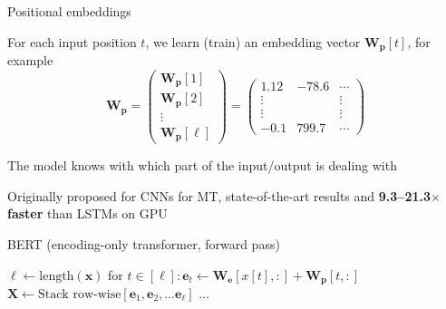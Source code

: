 \documentclass[12pt,aspectratio=169,handout]{beamer}
\begin{document}
\begin{frame}{Positional embeddings}

For each input position $t$, we learn (train) an embedding vector $\bm{W_p}[t]$, for example
$$
\bm{W_p} =
\begin{pmatrix}
\bm{W_p}[1] \\
\bm{W_p}[2] \\
\vdots \\
\bm{W_p}[\ell]
\end{pmatrix}
=
\begin{pmatrix}
1.12 & -78.6 & \cdots \\
\vdots & & \vdots \\
\vdots & & \vdots \\
-0.1 & 799.7 & \cdots
\end{pmatrix}
$$

The model knows with which part of the input/output is dealing with

\begin{small}
Originally proposed for CNNs for MT, state-of-the-art results and \textbf{9.3--21.3$\times$ faster} than LSTMs on GPU
\end{small}



\end{frame}


\begin{frame}{BERT (encoding-only transformer, forward pass)}
	

\begin{minipage}[t][10cm][t]{15cm}
\begin{algorithmic}[1]
\State $\ell \gets \text{length}(\bm{x})$
\State for $t \in [\ell]: \bm{e}_t \gets \bm{W_e}[x[t],:] + \bm{W_p}[t,:]$
\State $\bm{X} \gets \text{Stack row-wise}[\bm{e}_1, \bm{e}_2, \ldots \bm{e}_{\ell}]$
\State $\ldots$
\EndFunction
\end{algorithmic}

\end{minipage}
\end{frame}
\end{document}
